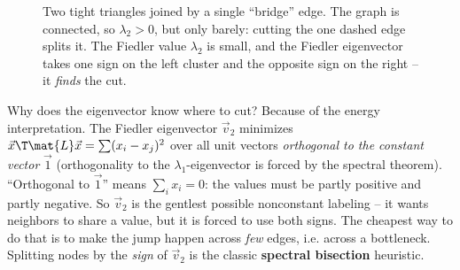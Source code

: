 \begin{figure}[H]
\centering
{}
\caption{Two tight triangles joined by a single ``bridge'' edge. The graph is connected, so
$\lambda_2 > 0$, but only barely: cutting the one dashed edge splits it. The Fiedler value
$\lambda_2$ is small, and the Fiedler eigenvector takes one sign on the left cluster and the
opposite sign on the right -- it \emph{finds} the cut.}
\label{ch35:fig-bridge}
\end{figure}

Why does the eigenvector know where to cut? Because of the energy interpretation. The
Fiedler eigenvector $\vec{v}_2$ minimizes $\vec{x}\T\mat{L}\vec{x} = \sum (x_i-x_j)^2$ over
all unit vectors \emph{orthogonal to the constant vector} $\vec{1}$ (orthogonality to the
$\lambda_1$-eigenvector is forced by the spectral theorem). ``Orthogonal to $\vec{1}$''
means $\sum_i x_i = 0$: the values must be partly positive and partly negative. So $\vec{v}_2$
is the gentlest possible nonconstant labeling -- it wants neighbors to share a value, but it
is forced to use both signs. The cheapest way to do that is to make the jump happen across
\emph{few} edges, i.e. across a bottleneck. Splitting nodes by the \emph{sign} of $\vec{v}_2$
is the classic \textbf{spectral bisection} heuristic.

